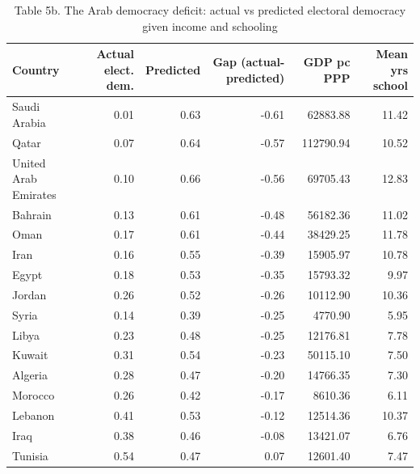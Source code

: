 \begin{table}
\caption{Table 5b. The Arab democracy deficit: actual vs predicted electoral democracy given income and schooling}
\label{tab:T5b_mena_deficit}
\begin{tabular}{lrrrrr}
\toprule
Country & Actual elect. dem. & Predicted & Gap (actual-predicted) & GDP pc PPP & Mean yrs school \\
\midrule
Saudi Arabia & 0.01 & 0.63 & -0.61 & 62883.88 & 11.42 \\
Qatar & 0.07 & 0.64 & -0.57 & 112790.94 & 10.52 \\
United Arab Emirates & 0.10 & 0.66 & -0.56 & 69705.43 & 12.83 \\
Bahrain & 0.13 & 0.61 & -0.48 & 56182.36 & 11.02 \\
Oman & 0.17 & 0.61 & -0.44 & 38429.25 & 11.78 \\
Iran & 0.16 & 0.55 & -0.39 & 15905.97 & 10.78 \\
Egypt & 0.18 & 0.53 & -0.35 & 15793.32 & 9.97 \\
Jordan & 0.26 & 0.52 & -0.26 & 10112.90 & 10.36 \\
Syria & 0.14 & 0.39 & -0.25 & 4770.90 & 5.95 \\
Libya & 0.23 & 0.48 & -0.25 & 12176.81 & 7.78 \\
Kuwait & 0.31 & 0.54 & -0.23 & 50115.10 & 7.50 \\
Algeria & 0.28 & 0.47 & -0.20 & 14766.35 & 7.30 \\
Morocco & 0.26 & 0.42 & -0.17 & 8610.36 & 6.11 \\
Lebanon & 0.41 & 0.53 & -0.12 & 12514.36 & 10.37 \\
Iraq & 0.38 & 0.46 & -0.08 & 13421.07 & 6.76 \\
Tunisia & 0.54 & 0.47 & 0.07 & 12601.40 & 7.47 \\
\bottomrule
\end{tabular}
\end{table}
